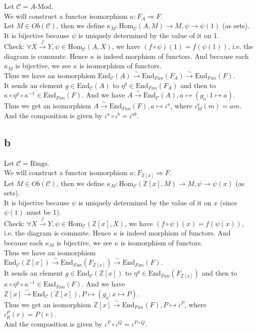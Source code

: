\documentclass{article}
\newcommand{\inv}{^{-1}}
\newcommand{\ZZ}{\mathbb{Z}}
\newcommand{\CCC}{\mathcal{C}}
\newcommand{\Hom}{\text{Hom}}
\newcommand{\End}{\text{End}}
\begin{document}
Let $\CCC=A\text{-Mod}$.\\
We will construct a functor isomorphism $\kappa:F_{A}\Rightarrow F$.\\
Let $M\in Ob(\CCC)$, then we define $\kappa_M:\Hom_\CCC(A,M)\rightarrow M,\psi\rightarrow \psi(1)$ (as sets).\\
It is bijective because $\psi$ is uniquely determined by the value of it on 1.\\
Check: $\forall X\xrightarrow{f} Y,\psi\in \Hom_\CCC(A,X)$, we have $(f\circ \psi)(1)=f(\psi(1))$, i.e. the diagram is commute. Hence $\kappa$ is indeed morphism of functors. And because each $\kappa_M$ is bijective, we see $\kappa$ is isomorphism of functors.\\
Thus we have an isomorphism $\End_\CCC(A)\xrightarrow{\sim} \End_{Fun}(F_A)\xrightarrow{\sim}\End_{Fun}(F)$.\\
It sends an element $g\in \End_\CCC(A)$ to $\eta^g\in \End_{Fun}(F_A)$ and then to $\kappa\circ \eta^g\circ \kappa\inv\in \End_{Fun}(F)$. And we have $A\xrightarrow{\sim}\End_\CCC(A),a\mapsto (g_a:1\mapsto a)$.\\
Thus we get an isomorphism $A\xrightarrow{\sim} \End_{Fun}(F),a\mapsto \iota^a$, where $\iota^a_M(m)=am$.\\
And the composition is given by $\iota^a\circ \iota^b=\iota^{ab}$.

\subsection{b}

Let $\CCC=\text{Rings}$.\\
We will construct a functor isomorphism $\kappa:F_{\ZZ[x]}\Rightarrow F$.\\
Let $M\in Ob(\CCC)$, then we define $\kappa_M:\Hom_\CCC(\ZZ[x],M)\rightarrow M,\psi\rightarrow \psi(x)$ (as sets).\\
It is bijective because $\psi$ is uniquely determined by the value of it on $x$ (since $\psi(1)$ must be 1).\\
Check: $\forall X\xrightarrow{f} Y,\psi\in \Hom_\CCC(\ZZ[x],X)$, we have $(f\circ \psi)(x)=f(\psi(x))$, i.e. the diagram is commute. Hence $\kappa$ is indeed morphism of functors. And because each $\kappa_M$ is bijective, we see $\kappa$ is isomorphism of functors.\\
Thus we have an isomorphism $\End_\CCC(\ZZ[x])\xrightarrow{\sim} \End_{Fun}(F_{\ZZ[x]})\xrightarrow{\sim}\End_{Fun}(F)$.\\
It sends an element $g\in \End_\CCC(\ZZ[x])$ to $\eta^g\in \End_{Fun}(F_{\ZZ[x]})$ and then to $\kappa\circ \eta^g\circ \kappa\inv\in \End_{Fun}(F)$. And we have $\ZZ[x]\xrightarrow{\sim}\End_\CCC(\ZZ[x]),P\mapsto (g_a:x\mapsto P)$.\\
Thus we get an isomorphism $\ZZ[x]\xrightarrow{\sim} \End_{Fun}(F),P\mapsto \iota^P$, where $\iota^P_R(r)=P(r)$.\\
And the composition is given by $\iota^P\circ \iota^Q=\iota^{P\circ Q}$.
\end{document}

